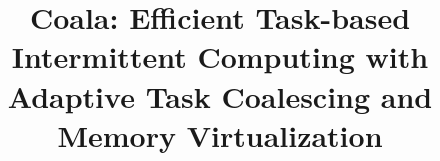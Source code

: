 \documentclass[pageno]{jpaper}
\newcommand{\sys}{Coala\xspace}
\newcommand{\sysfull}{\sys: Efficient Task-based Intermittent Computing with Adaptive Task Coalescing and Memory Virtualization}
\begin{document}
\title{\sysfull}









\date{}
\maketitle

\thispagestyle{empty}

\begin{abstract}
	


\end{abstract}

\end{document}
